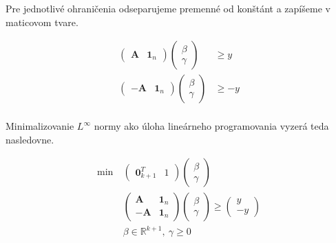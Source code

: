 \documentclass[report.tex]{subfiles}
\begin{document}
Pre jednotlivé ohraničenia odseparujeme premenné od konštánt a zapíšeme v maticovom tvare.

\begin{align*}
	\left(
		\begin{array}{c|c}
			\mathbf{A} & \mathbf{1}_n
		\end{array}
	\right)
	\left(
		\begin{array}{c}
			\beta \\
			\hline
			\gamma
		\end{array}
	\right) & \geq y \\
	\left(
		\begin{array}{c|c}
			-\mathbf{A} & \mathbf{1}_n
		\end{array}
	\right)
	\left(
		\begin{array}{c}
			\beta \\
			\hline
			\gamma
		\end{array}
	\right) &\geq -y \\
\end{align*}

\newpage

Minimalizovanie $L^{\infty}$ normy ako úloha lineárneho programovania vyzerá teda nasledovne.

\begin{align}
	\text{min}~ &
	\left(
		\begin{array}{c|c}
			\mathbf{0}_{k+1}^T & 1
		\end{array}
	\right)
	\left(
		\begin{array}{c}
			\beta \\
			\hline
			\gamma
		\end{array}
	\right) \nonumber \\
	&\left(
		\begin{array}{c|c}
			\mathbf{A} & \mathbf{1}_n \\
			\hline
			-\mathbf{A} & \mathbf{1}_n
		\end{array}
	\right)
	\left(
		\begin{array}{c}
			\beta \\
			\hline
			\gamma
		\end{array}
	\right)
	\geq
	\left(
		\begin{array}{c}
			y \\
			\hline
			-y
		\end{array}
	\right) \label{Pinf}\\
	&\beta \in \mathbb{R}^{k+1},~\gamma \geq 0 \nonumber
\end{align}
\end{document}
